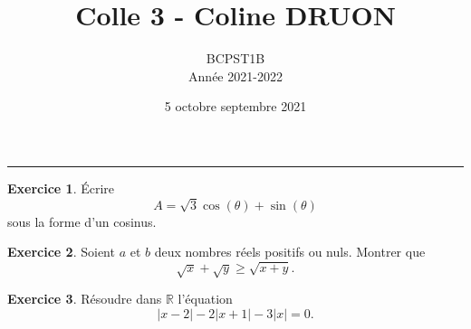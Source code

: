\documentclass[a4paper, 11pt,openany]{article}%
\title{Colle 3 - Coline DRUON}
\author{BCPST1B\\
Année 2021-2022}
\date{5 octobre septembre 2021}
\theoremstyle{plain}
\theoremstyle{definition}
\newtheorem{exo}{Exercice}
\newtheorem{sol}{Solution de l'exercice}
\theoremstyle{remark}
\newcommand{\R}{\mathbb{R}}
\begin{document}
   \maketitle
      \rule{\linewidth}{0.5mm}



\begin{exo}
Écrire 
\[ A = \sqrt{3} \cos(\theta) +  \sin (\theta)\]
sous la forme d'un cosinus.
\end{exo}
%


\begin{exo}
Soient $a$ et $b$ deux nombres réels positifs ou nuls. Montrer que
\[ \sqrt{x} + \sqrt{y} \geqslant \sqrt{x + y}.\]
\end{exo}


\begin{exo}
Résoudre dans $\R$ l'équation
\[ |x-2| - 2 |x+1| -3|x| = 0.\]
\end{exo}
\end{document}
